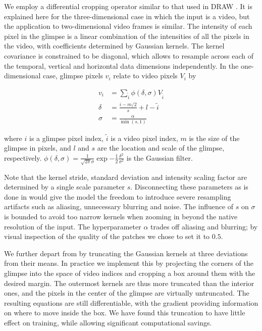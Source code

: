 \documentclass{article} %
\begin{document}
We employ a differential cropping operator similar to that used in DRAW \cite{draw}.
It is explained here for the three-dimensional case in which the input is
a video, but the application to two-dimensional video frames is similar.
The intensity of each pixel in the glimpse is a linear combination of the intensities of all the pixels in the video, with coefficients determined by Gaussian kernels.
The kernel covariance is constrained to be diagonal, which allows to resample across each of the temporal, vertical and horizontal data dimensions independently.
In the one-dimensional case, glimpse pixels $v_i$ relate to video pixels $V_i$ by

\begin{equation}
\begin{split}
v_i &= \sum_{\tilde{i}} \phi(\delta,\sigma) V_{\tilde{i}} \\
\delta & =  \frac{i - m/2}{s} + l - \tilde{i} \\
\sigma & =  \frac{\alpha}{\min(s, 1)}
\end{split}
\end{equation}

where $i$ is a glimpse pixel index, $\tilde{i}$ is a video pixel index, $m$ is the size of the glimpse in pixels, and $l$ and $s$ are the location and scale of the glimpse, respectively.
$\phi( \delta, \sigma ) = \frac{1}{\sqrt{2 \pi}\sigma} \exp{- \frac{1}{2} \frac{\delta^2}{\sigma^2}}$ is the Gaussian filter.

Note that the kernel stride, standard deviation and intensity scaling factor are determined by a single scale parameter $s$.
Disconnecting these parameters as is done in \cite{draw} would give the model the freedom to introduce severe resampling artifacts such as aliasing, unnecessary blurring and noise.
The influence of $s$ on $\sigma$ is bounded to avoid too narrow kernels when zooming in beyond the native resolution of the input.
The hyperparameter $\alpha$ trades off aliasing and blurring; by visual inspection of the quality of the patches we chose to set it to $0.5$.

We further depart from \cite{draw} by truncating the Gaussian kernels at three deviations from their means.
In practice we implement this by projecting the corners of the glimpse into the space of video indices and cropping a box around them with the desired margin.
The outermost kernels are thus more truncated than the interior ones, and the pixels in the center of the glimpse are virtually untruncated.
The resulting equations are still differentiable, with the gradient providing information on where to move inside the box.
We have found this truncation to have little effect on training, while allowing significant computational savings.
\end{document}
